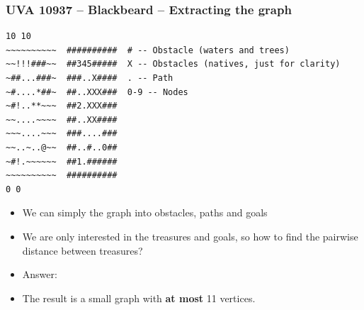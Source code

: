 \documentclass{beamer}
\begin{document}
\begin{frame}[fragile]
  \frametitle{UVA 10937 -- Blackbeard -- Extracting the graph}

  {\smaller
\begin{verbatim}
10 10
~~~~~~~~~~  ##########  # -- Obstacle (waters and trees)
~~!!!###~~  ##345#####  X -- Obstacles (natives, just for clarity)
~##...###~  ###..X####  . -- Path
~#....*##~  ##..XXX###  0-9 -- Nodes
~#!..**~~~  ##2.XXX###
~~....~~~~  ##..XX####
~~~....~~~  ###....###
~~..~..@~~  ##..#..0##
~#!.~~~~~~  ##1.######
~~~~~~~~~~  ##########
0 0
\end{verbatim}

\begin{itemize}
\item We can simply the graph into obstacles, paths and goals
\item We are only interested in the treasures and goals, so how to find the
  pairwise distance between treasures?
\item \alert{Answer}: 
\item The result is a small graph with {\bf at most} 11 vertices.
\end{itemize}

  }
\end{frame}
\end{document}
